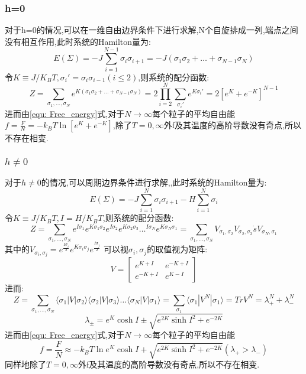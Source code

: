 \documentclass[12pt]{article} %
\begin{document}
\subsubsection{h=0}
对于h=0的情况,可以在一维自由边界条件下进行求解,N个自旋排成一列,端点之间没有相互作用,此时系统的Hamilton量为:
\begin{equation}
\label{equ: Hamilton_1D_H0}
E(\Sigma) = -J\sum_{i=1}^{N-1}\sigma_{i}\sigma_{i+1} = -J(\sigma_1\sigma_2+\dots+\sigma_{N-1}\sigma_N)
\end{equation}
令$K\equiv J/K_{B}T, \sigma_{i}'=\sigma_{i}\sigma_{i-1} (i\leq 2)$,则系统的配分函数:
\begin{equation}
\label{equ: Z_1D_H0}
Z = \sum_{\sigma_1,\dots,\sigma_N}e^{K(\sigma_1\sigma_2+\dots+\sigma_{N-1}\sigma_N)} = 2\prod_{i=2}^{N}\sum_{\sigma_{i}'}e^{K\sigma_{i}'} = 2[e^{K}+e^{-K}]^{N-1}
\end{equation}
进而由\eqref{equ: Free_energy}式,对于$N\rightarrow \infty$每个粒子的平均自由能$f = \frac{F}{N} = -k_{B}T\ln [e^{K}+e^{-K}]$,除了$T=0,\infty$外f及其温度的高阶导数没有奇点,所以不存在相变.

\subsubsection{$h\neq0$}
对于$h\neq0$的情况,可以周期边界条件进行求解,,此时系统的Hamilton量为:
\begin{equation}
\label{equ: Hamilton_1D_H}
E(\Sigma) = -J\sum_{i=1}^{N}\sigma_{i}\sigma_{i+1} - H\sum_{i=1}^{N}\sigma_i
\end{equation}
令$K\equiv J/K_{B}T, I = H/K_{B}T$,则系统的配分函数:
\begin{equation}
\label{equ: Z_1D_H0}
Z = \sum_{\sigma_1,\dots,\sigma_N}e^{I\sigma_1}e^{K\sigma_1\sigma_2}e^{I\sigma_2}e^{K\sigma_2\sigma_3}\dots^{I\sigma_N}e^{K\sigma_N\sigma_1}
= \sum_{\sigma_1,\dots,\sigma_N}V_{\sigma_1,\sigma_2}V_{\sigma_2,\sigma_3}\dot sV_{\sigma_N,\sigma_1}
\end{equation}
其中的$V_{\sigma_i,\sigma_j} = e^{\frac{I\sigma_i}{2}}e^{K\sigma_i\sigma_j}e^{\frac{I\sigma_j}{2}}$ 可以视$\sigma_i,\sigma_j$的取值视为矩阵:
$$
V=
\left[
\begin{matrix}
    e^{K+I}&e^{-K+I} \\
    e^{-K+I}&e^{K-I}
\end{matrix}
\right]
 $$
进而:
$$Z = \sum_{\sigma_1,\dots,\sigma_N}\langle\sigma_1|V|\sigma_2\rangle\langle\sigma_2|V|\sigma_3\rangle\dots\langle\sigma_N|V|\sigma_1\rangle = \sum_{\sigma_1}\langle\sigma_1|V^{N}|\sigma_1\rangle = Tr V^N = \lambda_{+}^N+\lambda_{-}^N $$
$$\lambda_{\pm} = e^K\cosh I \pm \sqrt{e^{2K}\sinh{I}^2+e^{-2K}}$$
进而由\eqref{equ: Free_energy}式,对于$N\rightarrow \infty$每个粒子的平均自由能
$$f = \frac{F}{N} \approx -k_{B}T\ln e^K\cosh I + \sqrt{e^{2K}\sinh{I}^2+e^{-2K}} (\lambda_{+}>\lambda_{-})$$
同样地除了$T=0,\infty$外f及其温度的高阶导数没有奇点,所以不存在相变.
\end{document}
